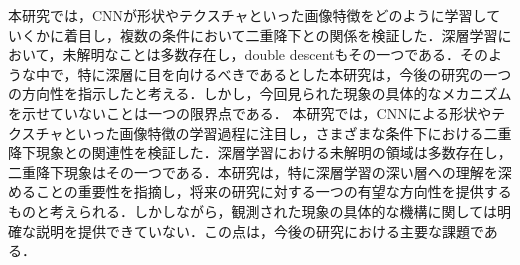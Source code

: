 本研究では，CNNが形状やテクスチャといった画像特徴をどのように学習していくかに着目し，複数の条件において二重降下との関係を検証した．深層学習において，未解明なことは多数存在し，double descentもその一つである．そのような中で，特に深層に目を向けるべきであるとした本研究は，今後の研究の一つの方向性を指示したと考える．しかし，今回見られた現象の具体的なメカニズムを示せていないことは一つの限界点である．
本研究では，CNNによる形状やテクスチャといった画像特徴の学習過程に注目し，さまざまな条件下における二重降下現象との関連性を検証した．深層学習における未解明の領域は多数存在し，二重降下現象はその一つである．本研究は，特に深層学習の深い層への理解を深めることの重要性を指摘し，将来の研究に対する一つの有望な方向性を提供するものと考えられる．しかしながら，観測された現象の具体的な機構に関しては明確な説明を提供できていない．この点は，今後の研究における主要な課題である．
\newpage